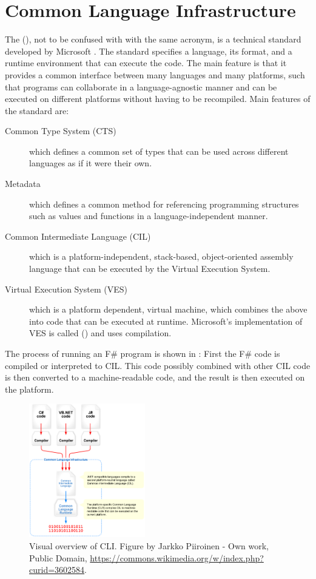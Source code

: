 \documentclass[fsharpnotes.tex]{subfiles}
\begin{document}
\chapter{Common Language Infrastructure}
\label{chap:cli} 
The  (), not to be confused with  with the same acronym, is a technical standard developed by Microsoft \cite{iso23271:2012, ecma335}. The standard specifies a language, its format, and a runtime environment that can execute the code. The main feature is that it provides a common interface between many languages and many platforms, such that programs can collaborate in a language-agnostic manner and can be executed on different platforms without having to be recompiled. Main features of the standard are:
\begin{description}
\item[Common Type System (CTS)] which defines a common set of types that can be used across different languages as if it were their own.
\item[Metadata] which defines a common method for referencing programming structures such as values and functions in a language-independent manner.
\item[Common Intermediate Language (CIL)] which is a platform-independent, stack-based, object-oriented assembly language that can be executed by the Virtual Execution System.
\item[Virtual Execution System (VES)] which is a platform dependent, virtual machine, which combines the above into code that can be executed at runtime. Microsoft's implementation of VES is called  () and uses  compilation.
\end{description}
The process of running an F\# program is shown in : First the F\# code is compiled or interpreted to CIL. This code possibly combined with other CIL code is then converted to a machine-readable code, and the result is then executed on the platform.
\begin{figure}
  \centering
  \includegraphics[width=0.45\textwidth]{Overview_of_the_Common_Language_Infrastructure}
  \caption{Visual overview of CLI. Figure by Jarkko Piiroinen - Own work, Public Domain, \url{https://commons.wikimedia.org/w/index.php?curid=3602584}.}
  \label{fig:cliOverview}
\end{figure}
\end{document}
